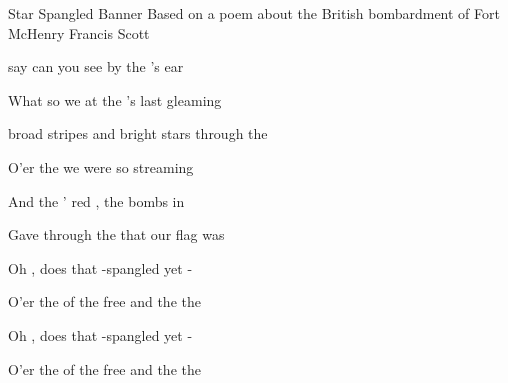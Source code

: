 \begin{SBSong}{Star Spangled Banner}
  {Based on a poem about the British bombardment of Fort McHenry}
  {Francis Scott}
  \begin{SBVerse*}
     say can you see by the 's ear 

    What so  we  at the 's last gleaming

     broad stripes and bright stars through the  

    O'er the  we  were so  streaming

    And the ' red , the bombs  in 

    Gave  through the  that our flag was  

    Oh , does that -spangled  yet -

    O'er the  of the free and the   the 
  \end{SBVerse*}
  \begin{SBVerse*}
    Oh , does that -spangled  yet -

    O'er the  of the free and the   the 
  \end{SBVerse*}
\end{SBSong}
